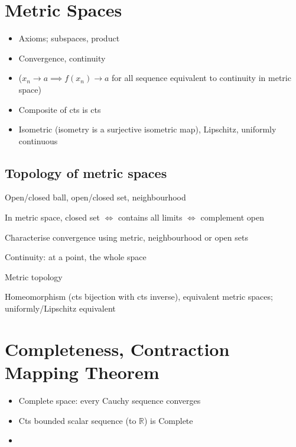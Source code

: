 \section{Metric Spaces}
\begin{itemize}
    \item Axioms; subspaces, product
    \item Convergence, continuity
    \item ($x_n \to a \implies f(x_n) \to a$ for all sequence equivalent to continuity in metric space)
    \item Composite of cts is cts
    \item Isometric (isometry is a surjective isometric map), Lipschitz, uniformly continuous
\end{itemize}
\subsection*{Topology of metric spaces}
\item Open/closed ball, open/closed set, neighbourhood
\item In metric space, closed set $\iff$ contains all limits $\iff$ complement open
\item Characterise convergence using metric, neighbourhood or open sets
\item Continuity: at a point, the whole space
\item Metric topology
\item Homeomorphism (cts bijection with cts inverse), equivalent metric spaces; uniformly/Lipschitz equivalent

\section{Completeness, Contraction Mapping Theorem}
\begin{itemize}
    \item Complete space: every Cauchy sequence converges
    \item Cts bounded scalar sequence (to $\mathbb{R}$) is Complete
    \item
\end{itemize}

